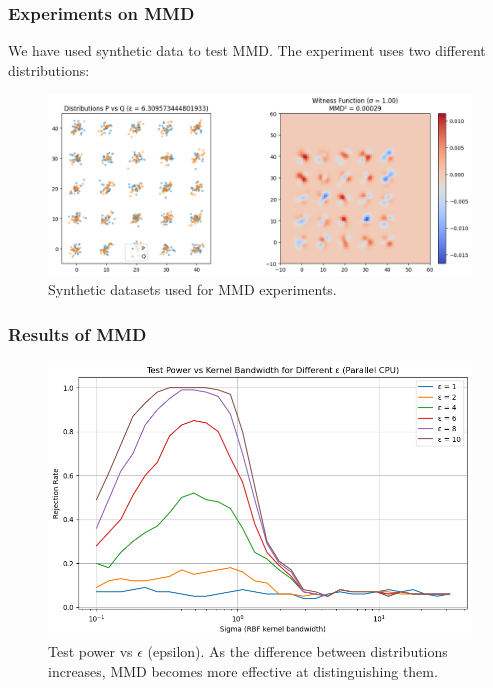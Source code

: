 \documentclass{beamer}
\begin{document}
\begin{frame}
    \frametitle{Experiments on MMD}
    We have used synthetic data to test MMD. The experiment uses two different distributions:
    \begin{figure}[h]
        \centering
        \includegraphics[width=0.9\linewidth]{mmdDataset.png}
        \caption{Synthetic datasets used for MMD experiments.}
    \end{figure}
\end{frame}

\begin{frame}
    \frametitle{Results of MMD}
    \begin{figure}[h]
        \centering
        \includegraphics[width=0.8\linewidth]{Test_powe_vs_eps.png}
        \caption{Test power vs $\epsilon$ (epsilon). As the difference between distributions increases, MMD becomes more effective at distinguishing them.}
    \end{figure}
\end{frame}


\end{document}
